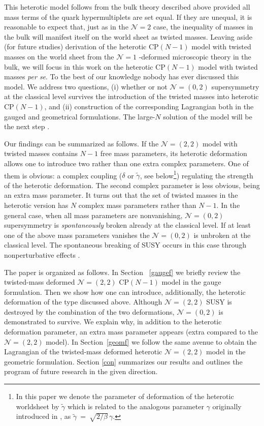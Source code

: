 \documentclass[12pt]{article}
\newcommand{\ntwo}{${\mathcal N}=2$ }
\newcommand{\ntwot}{${\mathcal N}= \left(2,2\right) $ }
\newcommand{\ntwoo}{${\mathcal N}= \left(0,2\right) $ }
\newcommand{\none}{${\mathcal N}=1$ }
\newcommand{\wt}{\widetilde}
\newcommand{\tgamma}{\wt{\gamma}}
\begin{document}
 This heterotic model follows from the bulk theory   described above provided all
 mass terms of the quark hypermultiplets are set equal. If they are unequal,
 it is reasonable to expect that, just as in the \ntwo case,
 the inequality of masses in the bulk will manifest itself  on the world sheet as
 twisted masses. Leaving aside (for future studies)
 derivation of the heterotic CP$(N-1)$ model with twisted masses on the world sheet
 from the \none-deformed microscopic theory in the bulk,
 we will focus in this work on the
  heterotic CP$(N-1)$ model with twisted masses {\em per se}. To the best of our knowledge
  nobody has ever discussed this model. 
  We address two questions, (i) whether or not \ntwoo supersymmetry at the classical level
  survives the introduction of the twisted masses into heterotic CP$(N-1)$,
  and (ii) construction of the corresponding Lagrangian both in the gauged and geometrical formulations.
  The large-$N$ solution of the model will be the next step \cite{BSY5}.
  
  Our findings can be summarized as follows. If the \ntwot model with twisted masses
  contains $N-1$ free mass parameters, its heterotic deformation allows one to introduce two rather than one 
  extra complex parameters. One of them is obvious: 
a complex coupling ($\delta$ or $\tgamma$, see below\footnote{
In this paper we denote the parameter of deformation of the heterotic worldsheet by $\tgamma$ 
which is related to the analogous parameter $\gamma$ originally introduced in \cite{SYhet}, as
$ \tgamma ~=~ \sqrt{2/\beta}\, \gamma $.})
 regulating the strength of the heterotic deformation. The second complex parameter is less obvious,
 being an extra mass parameter. It turns out that the set of twisted masses
 in the heterotic version has $N$ complex mass parameters rather than $N-1$.
 In the general case, when all mass parameters are nonvanishing, \ntwoo
 supersymmetry is {\em spontaneously} broken already at the classical level.
 If at least one of the above mass parameters vanishes the \ntwoo is unbroken at the classical level.
 The spontaneous breaking of SUSY occurs in this case through nonperturbative effects \cite{BSY5}.
 
 The paper is organized as follows. In Section ~\ref{gaugef} we briefly review
the twisted-mass deformed \ntwot CP$(N-1)$ model in the gauge formulation.
 Then we show how one can introduce, additionally, the heterotic deformation of the type discussed above.
 Although \ntwot SUSY is destroyed by the combination of the two deformations,
 \ntwoo is demonstrated to survive.
 We explain why, in addition to the heterotic deformation parameter, an extra mass parameter appears (extra
 compared to the \ntwot model). 
 \newpage
 In Section~\ref{geomf} we follow the same avenue to obtain 
 the Lagrangian of the  twisted-mass deformed heterotic  \ntwot model in the geometric formulation.
 Section \ref{con} summarizes our results and outlines the program of future research in the given direction.
\end{document}
